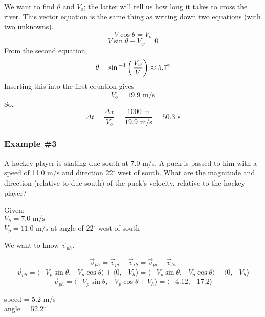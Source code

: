 We want to find $\theta$ and $V_o$; the latter will tell us how long it takes to cross the river. This vector equation is the same thing as writing down two equations (with two unknowns).
$$V\cos\theta=V_o$$
$$V\sin\theta-V_w=0$$
From the second equation,
$$\theta=\sin\displaystyle^{-1}\left(\frac{V_w}{V}\right)\approx 5.7^\circ$$
Inserting this into the first equation gives
$$V_o=19.9\mbox{ m/s}$$
So,
$$\Delta{t}=\frac{\Delta{x}}{V_o}=\frac{1000\mbox{ m}}{19.9 \mbox{ m/s}}=50.3\mbox{ s}$$

\subsubsection{Example \#3}
A hockey player is skating due south at 7.0 m/s. A puck is passed to him with a speed of 11.0 m/s and direction 22$^\circ$ west of south. What are the magnitude and direction (relative to due south) of the puck's velocity, relative to the hockey player?

Given:\\
$V_h=7.0\mbox{ m/s}$\\
$V_p=11.0\mbox{ m/s}$ at angle of $22^\circ$ west of south

We want to know $\vec{v}_{ph}$.

$$\vec{v}_{ph}=\vec{v}_{pi}+\vec{v}_{ih}=\vec{v}_{pi}-\vec{v}_{hi}$$
$$\vec{v}_{ph}=\langle{-V_p\sin\theta,-V_p\cos\theta}\rangle+\langle{0,-V_h}\rangle=\langle{-V_p\sin\theta,-V_p\cos\theta}\rangle-\langle{0,-V_h}\rangle$$
$$\vec{v}_{ph}=\langle{-V_p\sin\theta,-V_p\cos\theta+V_h}\rangle=\langle{-4.12,-17.2}\rangle$$

speed = 5.2 m/s\\
angle = 52.2$^\circ$ 




\clearpage
